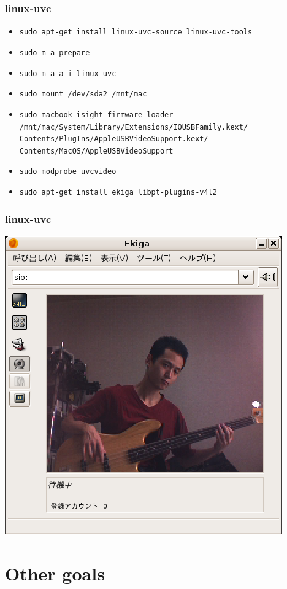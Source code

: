 \documentclass[cjk,dvipdfm]{beamer}
\begin{document}
\begin{frame}
 \frametitle{linux-uvc}
 \begin{itemize}
  \item \texttt{sudo apt-get install linux-uvc-source linux-uvc-tools}
  \item \texttt{sudo m-a prepare}
  \item \texttt{sudo m-a a-i linux-uvc}
  \item \texttt{sudo mount /dev/sda2 /mnt/mac}
  \item \texttt{sudo macbook-isight-firmware-loader \\
       /mnt/mac/System/Library/Extensions/IOUSBFamily.kext/\\Contents/PlugIns/AppleUSBVideoSupport.kext/\\Contents/MacOS/AppleUSBVideoSupport}
  \item \texttt{sudo modprobe uvcvideo}
  \item \texttt{sudo apt-get install ekiga libpt-plugins-v4l2}
 \end{itemize}
\end{frame}

\begin{frame}
 \frametitle{linux-uvc}
 \includegraphics[width=0.8\vsize]{image200607/ekiga.png}
\end{frame}

\section{Other goals}
\end{document}
